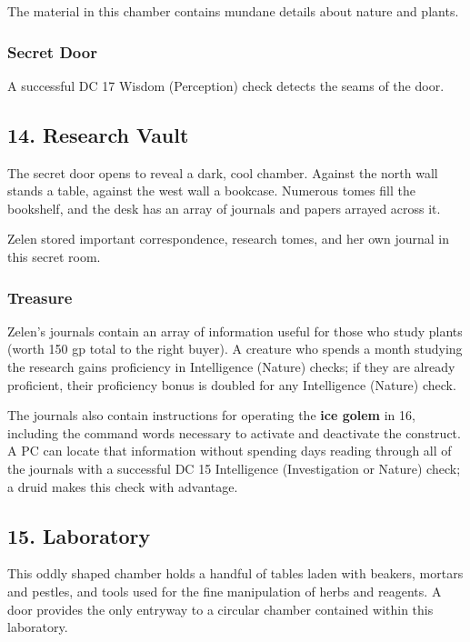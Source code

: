\documentclass[10pt,a4paper,twoside,bg=print,twocolumn,openany,nodeprecatedcode]{dndbook}
\begin{document}
The material in this chamber contains mundane details about nature and plants.

\subsubsection{Secret Door}
A successful DC 17 Wisdom (Perception) check detects the seams of the door.

\subsection{14. Research Vault}
\begin{DndReadAloud}{}
The secret door opens to reveal a dark, cool chamber. Against the north wall stands a table, against the west wall a bookcase. Numerous tomes fill the bookshelf, and the desk has an array of journals and papers arrayed across it.

\end{DndReadAloud}

Zelen stored important correspondence, research tomes, and her own journal in this secret room.

\subsubsection{Treasure}
Zelen's journals contain an array of information useful for those who study plants (worth 150 gp total to the right buyer). A creature who spends a month studying the research gains proficiency in Intelligence (Nature) checks; if they are already proficient, their proficiency bonus is doubled for any Intelligence (Nature) check.

The journals also contain instructions for operating the \textbf{ice golem} in 16, including the command words necessary to activate and deactivate the construct. A PC can locate that information without spending days reading through all of the journals with a successful DC 15 Intelligence (Investigation or Nature) check; a druid makes this check with advantage.

\subsection{15. Laboratory}
\begin{DndReadAloud}{}
This oddly shaped chamber holds a handful of tables laden with beakers, mortars and pestles, and tools used for the fine manipulation of herbs and reagents. A door provides the only entryway to a circular chamber contained within this laboratory.

\end{DndReadAloud}
\end{document}
